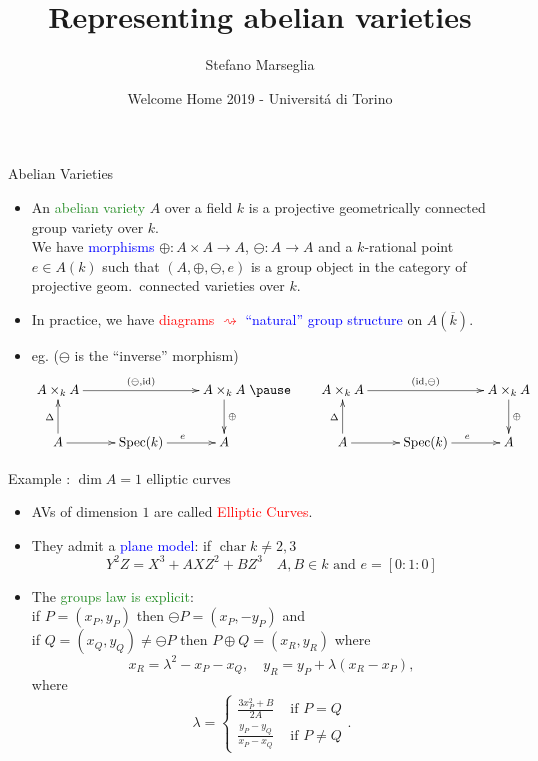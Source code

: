 \documentclass[usenames,dvipsnames]{beamer}
\title[]{Representing abelian varieties}
\subtitle{}
\author[Stefano Marseglia]{Stefano Marseglia}
\institute[]{Utrecht University}
\date[19 December 2019]{Welcome Home 2019 - Universit\'a di Torino}
\DeclareMathOperator{\Char}{char}
\DeclareMathOperator{\Spec}{Spec}
\DeclareMathOperator{\id}{id}
\newcommand{\red}[1]{\textcolor{red}{#1}}
\newcommand{\blue}[1]{\textcolor{blue}{#1}}
\newcommand{\green}[1]{\textcolor{ForestGreen}{#1}}
\begin{document}
\begin{frame}
\titlepage
\end{frame}

\begin{frame}{ Abelian Varieties }
\begin{itemize}
 \item An \green{abelian variety} $A$ over a field $k$ is a projective geometrically connected group variety over $k$.\\
 \pause We have \blue{morphisms} $\oplus:A\times A \to A$, $\ominus:A\to A$ and a $k$-rational point $e\in A(k)$ such that $(A,\oplus,\ominus,e)$ is a group object in the category of projective geom.~connected varieties over $k$.
 \pause \item In practice, we have \red{diagrams $\rightsquigarrow$} \blue{``natural'' group structure} on $A(\overline k)$.
 \pause \item eg. ($\ominus$ is the ``inverse'' morphism)
 {\tiny
 \[ 
 	\xymatrix{
 		A\times_k A \ar[rr]^{(\ominus,\id)} 	& 						& A\times_k A \ar[d]^{\oplus}\\
 		A \ar[u]^{\Delta} \ar[r] 	& \Spec(k) \ar[r]^{e}	& A 
 	}
 	\pause \qquad
 	\xymatrix{
 		A\times_k A \ar[rr]^{(\id,\ominus)} 	& 						& A\times_k A \ar[d]^{\oplus}\\
 		A \ar[u]^{\Delta} \ar[r] 	& \Spec(k) \ar[r]^{e}	& A 
 	}
  \]}
\end{itemize}
\end{frame}

\begin{frame}{ Example : $\dim A=1$ elliptic curves  }
\begin{itemize}
	\item AVs of dimension $1$ are called \red{Elliptic Curves}.
	\pause \item They admit a \blue{plane model}: if $\Char k \neq 2,3$
	\[  Y^2Z = X^3 +AXZ^2 + BZ^3\quad A,B \in k\text{ and }e=[0:1:0]  \]
	\pause \item The \green{groups law is explicit}:\\
	if $P=(x_P,y_P) $ then $ \ominus P=(x_P,-y_P) $ and\\
	\pause if $Q=(x_Q,y_Q)\neq \ominus P$ then $P\oplus Q=(x_R,y_R)$ where
	\[ x_R = \lambda^2 -x_P-x_Q, \quad y_R = y_P+\lambda (x_R-x_P), \]
	where
	\[ \lambda = 
	\begin{cases}
		\frac{3x_P^2 + B}{2A}& \text{ if } P=Q  \\
		\frac{y_P -y_Q}{x_P - x_Q} &  \text{ if } P\neq Q
	\end{cases}.
	\]
	
\end{itemize}
\end{frame}
\end{document}
